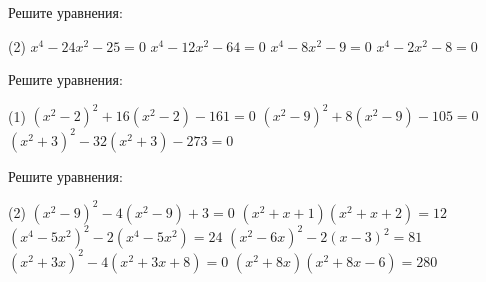 \begin{class}[number=3]
	\begin{listofex}
		\item Решите уравнения:
		\begin{tasks}(2)
			\task \( x^{4}-24x^{2}-25=0 \)
			\task \( x^{4}-12x^{2}-64=0 \)
			\task \( x^{4}-8x^{2}-9=0 \)
			\task \( x^{4}-2x^{2}-8=0 \)
		\end{tasks}
		\item Решите уравнения:
		\begin{tasks}(1)
			\task \( (x^{2}-2)^{2}+16(x^{2}-2)-161=0 \)
			\task \( (x^{2}-9)^{2}+8(x^{2}-9)-105=0 \)
			\task \( (x^{2}+3)^{2}-32(x^{2}+3)-273=0 \)
		\end{tasks}
		\item Решите уравнения: \begin{tasks}(2)
			\task \( (x^{2}-9)^{2}-4(x^{2}-9)+3=0 \)
			\task \( (x^{2}+x+1)(x^{2}+x+2)=12 \)
			\task \( (x^{4}-5x^{2})^{2}-2(x^{4}-5x^{2})=24 \)
			\task \( (x^{2}-6x)^{2}-2(x-3)^{2}=81 \)
			\task \( (x^{2}+3x)^{2}-4(x^{2}+3x+8)=0 \)
			\task \( (x^{2}+8x)(x^{2}+8x-6)=280 \)
		\end{tasks}
		
	\end{listofex}
\end{class}

